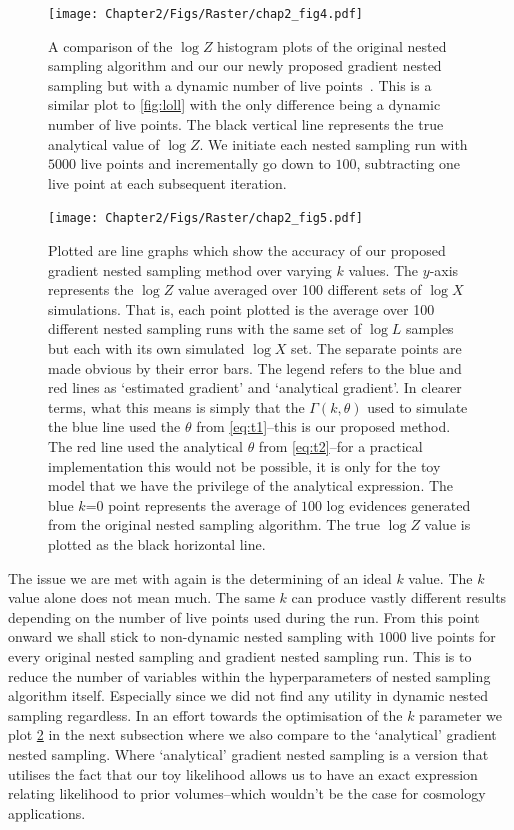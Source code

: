 \begin{figure} 
\centering    
\texttt{[image: Chapter2/Figs/Raster/chap2\_fig4.pdf]}
\caption{A comparison of the $\log Z$ histogram plots of the original nested sampling algorithm and our our newly proposed gradient nested sampling but with a dynamic number of live points~\cite{Higson_2018}. This is a similar plot to \cref{fig:loll} with the only difference being a dynamic number of live points. The black vertical line represents the true analytical value of $\log Z$. We initiate each nested sampling run with $5000$ live points and incrementally go down to $100$, subtracting one live point at each subsequent iteration.}
\label{fig:logL function} 
\end{figure}




\begin{figure} 
\centering    
\texttt{[image: Chapter2/Figs/Raster/chap2\_fig5.pdf]}
\caption{ Plotted are line graphs which show the accuracy of our proposed gradient nested sampling method over varying $k$ values. The $y$-axis represents the $\log Z$ value averaged over 100 different sets of $\log X$ simulations. That is, each point plotted is the average over 100 different nested sampling runs with the same set of $\log L$ samples but each with its own simulated $\log X$ set. The separate points are made obvious by their error bars. The legend refers to the blue and red lines as `estimated gradient' and `analytical gradient'. In clearer terms, what this means is simply that the $\Gamma (k,\theta)$ used to simulate the blue line used the $\theta$ from \cref{eq:t1}--this is our proposed method. The red line used the analytical $\theta$ from \cref{eq:t2}--for a practical implementation this would not be possible, it is only for the toy model that we have the privilege of the analytical expression. The blue $k$=0 point represents the average of $100$ log evidences generated from the original nested sampling algorithm. The true $\log Z$ value is plotted as the black horizontal line.}
\label{fig:loglol}
\end{figure}

The issue we are met with again is the determining of an ideal $k$ value. The $k$ value alone does not mean much. The same $k$ can produce vastly different results depending on the number of live points used during the run. From this point onward  we shall stick to non-dynamic nested sampling with $1000$ live points for every original nested sampling and gradient nested sampling run. This is to reduce the number of variables within the hyperparameters of nested sampling algorithm itself. Especially since we did not find any utility in dynamic nested sampling regardless. In an effort towards the optimisation of the $k$ parameter we plot \cref{fig:loglol} in the next subsection where we also compare to the `analytical' gradient nested sampling. Where `analytical' gradient nested sampling is a version that utilises the fact that our toy likelihood allows us to have an exact expression relating likelihood to prior volumes--which wouldn't be the case for cosmology applications. 


